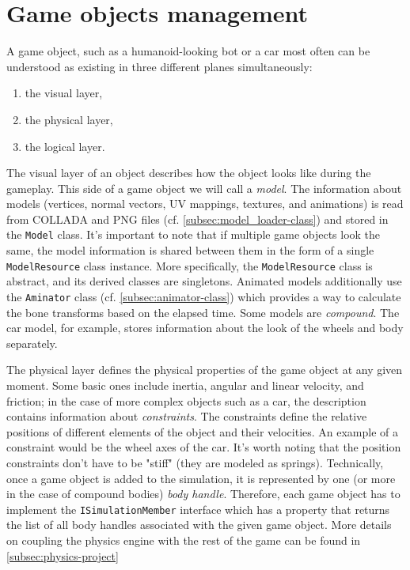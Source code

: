 \section{Game objects management}
A game object, such as a humanoid-looking bot or a car most often can be understood as existing in three different planes simultaneously:
\begin{enumerate}
    \item the visual layer,
    \item the physical layer,
    \item the logical layer.
\end{enumerate}
The visual layer of an object describes how the object looks like during the gameplay.
This side of a game object we will call a \textit{model}.
The information about models (vertices, normal vectors, UV mappings, textures, and animations) is read from COLLADA and PNG files (cf. \autoref{subsec:model_loader-class}) and stored in the \texttt{Model} class.
It's important to note that if multiple game objects look the same, the model information is shared between them in the form of a single \texttt{ModelResource} class instance.
More specifically, the \texttt{ModelResource} class is abstract, and its derived classes are singletons.
Animated models additionally use the \texttt{Aminator} class (cf. \autoref{subsec:animator-class}) which provides a way to calculate the bone transforms based on the elapsed time.
Some models are \textit{compound}.
The car model, for example, stores information about the look of the wheels and body separately.

The physical layer defines the physical properties of the game object at any given moment.
Some basic ones include inertia, angular and linear velocity, and friction;
in the case of more complex objects such as a car, the description contains information about \textit{constraints}.
The constraints define the relative positions of different elements of the object and their velocities.
An example of a constraint would be the wheel axes of the car.
It's worth noting that the position constraints don't have to be "stiff" (they are modeled as springs).
Technically, once a game object is added to the simulation, it is represented by one (or more in the case of compound bodies) \textit{body handle}.
Therefore, each game object has to implement the \texttt{ISimulationMember} interface which has a property that returns the list of all body handles associated with the given game object.
More details on coupling the physics engine with the rest of the game can be found in \autoref{subsec:physics-project}

